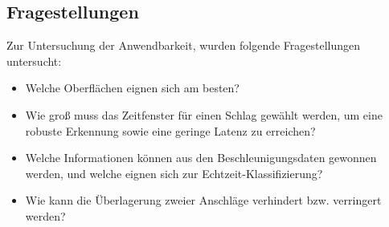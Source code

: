 \subsection{Fragestellungen}
Zur Untersuchung der Anwendbarkeit, wurden folgende Fragestellungen untersucht:
\begin{itemize}
	\item Welche Oberflächen eignen sich am besten?
	\item Wie groß muss das Zeitfenster für einen Schlag gewählt werden, um eine robuste Erkennung sowie eine geringe Latenz zu erreichen?
	\item Welche Informationen können aus den Beschleunigungsdaten gewonnen werden, und welche eignen sich zur Echtzeit-Klassifizierung?
	\item Wie kann die Überlagerung zweier Anschläge verhindert bzw. verringert werden?
\end{itemize}